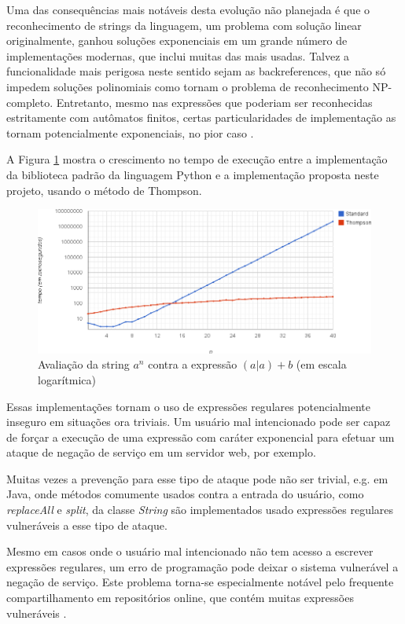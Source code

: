 \documentclass[a4paper,12pt,oneside,onecolumn]{uerj}
\begin{document}
Uma das consequências mais notáveis desta evolução não planejada é que o reconhecimento de strings da linguagem, um problema com solução linear originalmente, ganhou soluções exponenciais em um grande número de implementações modernas, que inclui muitas das mais usadas. Talvez a funcionalidade mais perigosa neste sentido sejam as backreferences, que não só impedem soluções polinomiais como tornam o problema de reconhecimento NP-completo. Entretanto, mesmo nas expressões que poderiam ser reconhecidas estritamente com autômatos finitos, certas particularidades de implementação as tornam potencialmente exponenciais, no pior caso \cite{bib:Cox07}.

A Figura \ref{fig:benchmark1} mostra o crescimento no tempo de execução entre a implementação da biblioteca padrão da linguagem Python e a implementação proposta neste projeto, usando o método de Thompson. 

\begin{figure}[ht]
  \centering
  \includegraphics[scale=0.5]{figures/benchmark1.png}
  \caption{Avaliação da string $a^n$ contra a expressão $(a|a)+b$ (em escala logarítmica)}
  \label{fig:benchmark1}
\end{figure}

Essas implementações tornam o uso de expressões regulares potencialmente inseguro em situações ora triviais. Um usuário mal intencionado pode ser capaz de forçar a execução de uma expressão com caráter exponencial para efetuar um ataque de negação de serviço em um servidor web, por exemplo. 

Muitas vezes a prevenção para esse tipo de ataque pode não ser trivial, e.g. em Java, onde métodos comumente usados contra a entrada do usuário, como \emph{replaceAll} e \emph{split}, da classe \emph{String} são implementados usado expressões regulares vulneráveis a esse tipo de ataque.

Mesmo em casos onde o usuário mal intencionado não tem acesso a escrever expressões regulares, um erro de programação pode deixar o sistema vulnerável a negação de serviço. Este problema torna-se especialmente notável pelo frequente compartilhamento em repositórios online, que contém muitas expressões vulneráveis \cite{bib:Kirrage13,bib:Weidman10}. 
\end{document}
